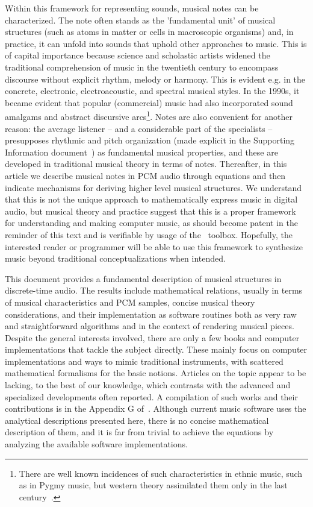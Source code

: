 Within this framework for representing sounds,
musical notes can be characterized.
The note often stands as the 'fundamental unit' of musical structures
(such as atoms in matter or cells in macroscopic organisms) and,
in practice, it can unfold into sounds that uphold other approaches to music.
This is of capital importance because science and scholastic artists
widened the traditional comprehension of music in the twentieth century
to encompass discourse without explicit rhythm, melody or harmony.
This is evident e.g. in the concrete, electronic, electroacoustic,
and spectral musical styles.
In the 1990s, it became evident that popular
(commercial) music had also incorporated
sound amalgams and abstract discursive arcs\footnote{There
are well known incidences of such characteristics in ethnic music,
such as in Pygmy music, but western theory assimilated them
only in the last century~\cite{Wisnick}.}.
Notes are also convenient for another reason:
the average listener -- and a considerable part of the specialists --
presupposes rhythmic and pitch organization 
(made explicit in the Supporting Information document~\cite{massNotesInMusic})
as fundamental musical properties,
and these are developed in traditional musical theory in terms of notes.
Thereafter, in this article we describe musical notes in PCM audio through equations
and then indicate mechanisms for deriving higher level musical structures.
We understand that this is not the unique approach to mathematically express music in
digital audio, but musical theory and practice suggest that
this is a proper framework for understanding and making computer music,
as should become patent in the reminder of this text and is verifiable
by usage of the \massa\ toolbox.
Hopefully, the interested reader or programmer will be able to use
this framework to synthesize music beyond traditional conceptualizations when intended.

This document provides a
fundamental description of musical structures
in discrete-time audio.
The results include mathematical relations,
usually in terms of musical characteristics and PCM samples,
concise musical theory considerations,
and their implementation as software routines both as
very raw and straightforward algorithms and in the context of rendering musical pieces.
Despite the general interests involved,
there are only a few books and computer implementations that tackle the subject directly.
These mainly focus on computer implementations and ways to mimic traditional instruments,
with scattered mathematical formalisms for the basic notions.
Articles on the topic appear to be lacking, to the best of our knowledge,
which contrasts with the advanced and specialized developments often reported.
A compilation of such works and their contributions is in the Appendix G of~\cite{dissertacao}.
Although current music software uses the analytical descriptions presented here,
there is no concise mathematical description of them, and it is far from trivial
to achieve the equations by analyzing the available software implementations.

